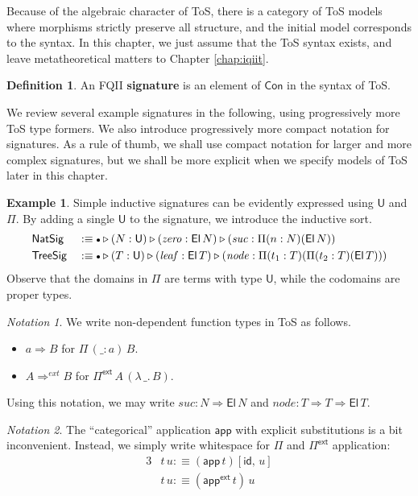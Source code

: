 \documentclass[12pt,a4paper,twoside,openany]{book}
\theoremstyle{remark}
\newtheorem{notation}{Notation}
\theoremstyle{definition}
\newtheorem{mydefinition}{Definition}
\newtheorem{myexample}{Example}
\theoremstyle{theorem}
\newcommand{\mi}[1]{\mathit{#1}}
\newcommand{\ms}[1]{\mathsf{#1}}
\newcommand{\id}{\mathsf{id}}
\newcommand{\Con}{\mathsf{Con}}
\newcommand{\U}{\mathsf{U}}
\newcommand{\El}{\mathsf{El}}
\newcommand{\ext}{\triangleright}
\newcommand{\emptycon}{\scaleobj{.75}\bullet}
\newcommand{\Pii}{\Pi}
\newcommand{\funi}{\Rightarrow}
\newcommand{\fune}{\Rightarrow^{ext}}
\newcommand{\appi}{\mathsf{app}}
\newcommand{\Pie}{\Pi^{\mathsf{ext}}}
\newcommand{\appe}{\mathsf{app^{ext}}}
\newcommand{\app}{\ms{app}}
\newcommand{\defn}{:\equiv}
\begin{document}
Because of the algebraic character of ToS, there is a category of ToS models
where morphisms strictly preserve all structure, and the initial model
corresponds to the syntax. In this chapter, we just assume that the ToS
syntax exists, and leave metatheoretical matters to Chapter \ref{chap:iqiit}.
\begin{mydefinition} An FQII \textbf{signature} is an element of $\Con$ in the syntax of ToS.
\end{mydefinition}
We review several example signatures in the following, using progressively
more ToS type formers.  We also introduce progressively more compact notation
for signatures. As a rule of thumb, we shall use compact notation for larger and
more complex signatures, but we shall be more explicit when we specify models of
ToS later in this chapter.
\begin{myexample}
  Simple inductive signatures can be evidently expressed using $\U$ and
  $\Pi$. By adding a single $\U$ to the signature, we introduce the inductive
  sort.
  \begin{alignat*}{3}
    & \ms{NatSig} &&\defn \emptycon \ext (N : \U) \ext (\mi{zero} : \El\,N)
                        \ext (\mi{suc} : \Pi (n : N) (\El\,N))\\
    & \ms{TreeSig} &&\defn \emptycon \ext (T : \U) \ext (\mi{leaf} : \El\,T)
                         \ext (\mi{node} : \Pi (t_1 : T) (\Pi (t_2 : T) (\El\,T)))
  \end{alignat*}
  Observe that the domains in $\Pi$ are terms with type $\U$, while the codomains are proper types.
\end{myexample}

\begin{notation} We write non-dependent function types in ToS as follows.
  \begin{itemize}
  \item $a \funi B$ for $\Pi\,(\_ : a)\,B$.
  \item $A \fune B$ for $\Pie\,A\,(\lambda\,\_.\,B)$.
  \end{itemize}
\end{notation}
\noindent
Using this notation, we may write $\mi{suc} : N \funi \El\,N$ and $\mi{node} : T
\funi T \funi \El\,T$.

\begin{notation}
The ``categorical'' application $\app$ with explicit substitutions is a bit
inconvenient. Instead, we simply write whitespace for $\Pii$ and $\Pie$
application:
\begin{alignat*}{3}
  & t\,u \defn (\appi\,t)[\id,\,u]\\
  & t\,u \defn (\appe\,t)\,u
\end{alignat*}
\end{notation}
\end{document}

